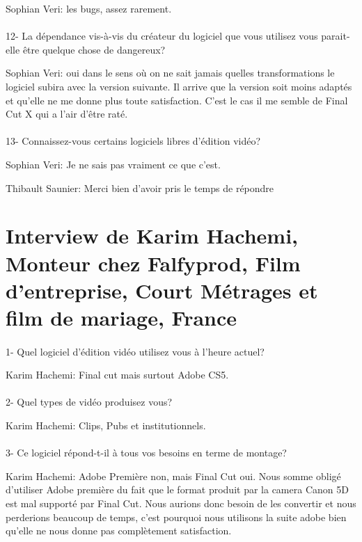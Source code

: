 Sophian Veri: les bugs, assez rarement.

\paragraph{}
12- La dépendance vis-à-vis du créateur du logiciel que vous utilisez
vous parait-elle être quelque chose de dangereux?

Sophian Veri: oui dans le sens où on ne sait jamais quelles transformations le
logiciel subira avec la version suivante. Il arrive que la version soit moins adaptés
et qu'elle ne me donne plus toute satisfaction. C'est le cas il me semble de Final Cut
X qui a l'air d'être raté.

\paragraph{}
13- Connaissez-vous certains logiciels libres d'édition vidéo?

Sophian Veri: Je ne sais pas vraiment ce que c'est.

Thibault Saunier: Merci bien d'avoir pris le temps de répondre

\newpage\section*{Interview de Karim Hachemi, Monteur chez Falfyprod, Film d'entreprise,
Court Métrages et film de mariage, France}

\paragraph{}
1-  Quel logiciel d'édition vidéo utilisez vous à l'heure actuel?

Karim Hachemi: Final cut mais surtout Adobe CS5.

\paragraph{}
2- Quel types de vidéo produisez vous?

Karim Hachemi: Clips, Pubs et institutionnels.

\paragraph{}
3- Ce logiciel répond-t-il à tous vos besoins en terme de montage?

Karim Hachemi: Adobe Première non, mais Final Cut oui.
Nous somme obligé d'utiliser Adobe première du fait que
le format produit par la camera Canon 5D est mal supporté par Final Cut.
Nous aurions donc besoin de les convertir et nous perderions beaucoup de
temps, c'est pourquoi nous utilisons la suite adobe bien qu'elle ne nous donne
pas complètement satisfaction.

